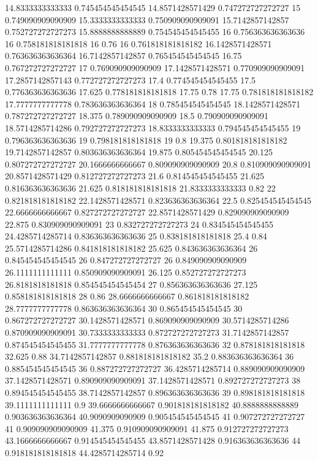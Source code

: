 {14.8333333333333 0.745454545454545
14.8571428571429 0.747272727272727
15 0.749090909090909
15.3333333333333 0.750909090909091
15.7142857142857 0.752727272727273
15.8888888888889 0.754545454545455
16 0.756363636363636
16 0.758181818181818
16 0.76
16 0.761818181818182
16.1428571428571 0.763636363636364
16.7142857142857 0.765454545454545
16.75 0.767272727272727
17 0.769090909090909
17.1428571428571 0.770909090909091
17.2857142857143 0.772727272727273
17.4 0.774545454545455
17.5 0.776363636363636
17.625 0.778181818181818
17.75 0.78
17.75 0.781818181818182
17.7777777777778 0.783636363636364
18 0.785454545454545
18.1428571428571 0.787272727272727
18.375 0.789090909090909
18.5 0.790909090909091
18.5714285714286 0.792727272727273
18.8333333333333 0.794545454545455
19 0.796363636363636
19 0.798181818181818
19 0.8
19.375 0.801818181818182
19.7142857142857 0.803636363636364
19.875 0.805454545454545
20.125 0.807272727272727
20.1666666666667 0.809090909090909
20.8 0.810909090909091
20.8571428571429 0.812727272727273
21.6 0.814545454545455
21.625 0.816363636363636
21.625 0.818181818181818
21.8333333333333 0.82
22 0.821818181818182
22.1428571428571 0.823636363636364
22.5 0.825454545454545
22.6666666666667 0.827272727272727
22.8571428571429 0.829090909090909
22.875 0.830909090909091
23 0.832727272727273
24 0.834545454545455
24.4285714285714 0.836363636363636
25 0.838181818181818
25.4 0.84
25.5714285714286 0.841818181818182
25.625 0.843636363636364
26 0.845454545454545
26 0.847272727272727
26 0.849090909090909
26.1111111111111 0.850909090909091
26.125 0.852727272727273
26.8181818181818 0.854545454545454
27 0.856363636363636
27.125 0.858181818181818
28 0.86
28.6666666666667 0.861818181818182
28.7777777777778 0.863636363636364
30 0.865454545454545
30 0.867272727272727
30.1428571428571 0.869090909090909
30.5714285714286 0.870909090909091
30.7333333333333 0.872727272727273
31.7142857142857 0.874545454545455
31.7777777777778 0.876363636363636
32 0.878181818181818
32.625 0.88
34.7142857142857 0.881818181818182
35.2 0.883636363636364
36 0.885454545454545
36 0.887272727272727
36.4285714285714 0.889090909090909
37.1428571428571 0.890909090909091
37.1428571428571 0.892727272727273
38 0.894545454545455
38.7142857142857 0.896363636363636
39 0.898181818181818
39.1111111111111 0.9
39.6666666666667 0.901818181818182
40.8888888888889 0.903636363636364
40.9090909090909 0.905454545454545
41 0.907272727272727
41 0.909090909090909
41.375 0.910909090909091
41.875 0.912727272727273
43.1666666666667 0.914545454545455
43.8571428571428 0.916363636363636
44 0.918181818181818
44.4285714285714 0.92
}
